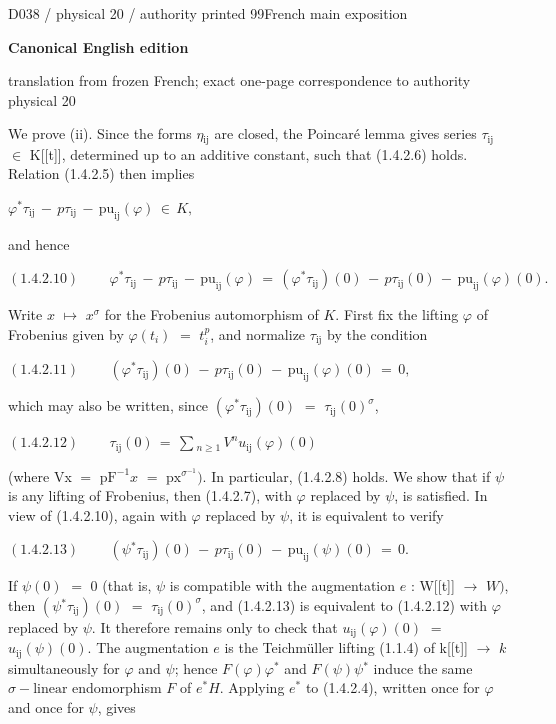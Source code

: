 \documentclass[9pt]{article}
\newcommand{\CanonText}[1]{\par{\fontsize{8.0}{9.35}\selectfont\RaggedRight #1\par}\vspace{2.2pt}}
\newcommand{\CanonDisplay}[1]{\par\vspace{1.2pt}\begin{center}{\fontsize{7.2}{8.4}\selectfont\(\displaystyle #1\)}\end{center}\vspace{1.2pt}}
\newcommand{\LayerTitle}{Canonical English edition}
\begin{document}
\noindent\begin{minipage}[t][\dimexpr\textheight-5pt\relax][t]{\textwidth}
{\sffamily\fontsize{7.3}{8.2}\selectfont\color{Quiet} D038 / physical 20 / authority printed 99\hfill French main exposition}
\par{}\vspace{4.5pt}
{\sffamily\fontsize{10.4}{11.6}\selectfont\bfseries\color{Accent} \LayerTitle}
\par{\sffamily\fontsize{6.7}{7.7}\selectfont\color{Quiet} translation from frozen French; exact one-page correspondence to authority physical 20}
\vspace{5pt}
\CanonText{We prove (ii). Since the forms \(\eta{}_{\mathrm{ij}}\) are closed, the Poincaré lemma gives series \(\tau{}_{\mathrm{ij}}\) \(\in{}\) K[[t]], determined up to an additive constant, such that (1.4.2.6) holds. Relation (1.4.2.5) then implies}
\CanonDisplay{\varphi{}^{*}\tau{}_{\mathrm{ij}}\,-\,p\tau{}_{\mathrm{ij}}\,-\,\text{pu}_{\mathrm{ij}}(\varphi{})\,\in{}\,K,}
\CanonText{and hence}
\CanonDisplay{(1.4.2.10)\qquad\,\varphi{}^{*}\tau{}_{\mathrm{ij}}\,-\,p\tau{}_{\mathrm{ij}}\,-\,\text{pu}_{\mathrm{ij}}(\varphi{})\,=\,(\varphi{}^{*}\tau{}_{\mathrm{ij}})(0)\,-\,p\tau{}_{\mathrm{ij}}(0)\,-\,\text{pu}_{\mathrm{ij}}(\varphi{})(0).}
\CanonText{Write \(x\) \(\mapsto{}\) \(x^\sigma{}\) for the Frobenius automorphism of \(K\). First fix the lifting \(\varphi{}\) of Frobenius given by \(\varphi{}(t_{i})\) \(=\) \(t_{i}^{p}\), and normalize \(\tau{}_{\mathrm{ij}}\) by the condition}
\CanonDisplay{(1.4.2.11)\qquad\,(\varphi{}^{*}\tau{}_{\mathrm{ij}})(0)\,-\,p\tau{}_{\mathrm{ij}}(0)\,-\,\text{pu}_{\mathrm{ij}}(\varphi{})(0)\,=\,0,}
\CanonText{which may also be written, since \((\varphi{}^{*}\tau{}_{\mathrm{ij}})(0)\) \(=\) \(\tau{}_{\mathrm{ij}}(0)^\sigma{}\),}
\CanonDisplay{(1.4.2.12)\qquad\,\tau{}_{\mathrm{ij}}(0)\,=\,\sum{}_{n\geq{}1}\,V^{n}u_{\mathrm{ij}}(\varphi{})(0)}
\CanonText{(where Vx \(=\) \(\text{pF}^{-1}x\) \(=\) \(\text{px}^{\sigma{}^{-1}})\). In particular, (1.4.2.8) holds. We show that if \(\psi{}\) is any lifting of Frobenius, then (1.4.2.7), with \(\varphi{}\) replaced by \(\psi{}\), is satisfied. In view of (1.4.2.10), again with \(\varphi{}\) replaced by \(\psi{}\), it is equivalent to verify}
\CanonDisplay{(1.4.2.13)\qquad\,(\psi{}^{*}\tau{}_{\mathrm{ij}})(0)\,-\,p\tau{}_{\mathrm{ij}}(0)\,-\,\text{pu}_{\mathrm{ij}}(\psi{})(0)\,=\,0.}
\CanonText{If \(\psi{}(0)\) \(=\) 0 (that is, \(\psi{}\) is compatible with the augmentation \(e\) : W[[t]] \(\to{}\) \(W)\), then \((\psi{}^{*}\tau{}_{\mathrm{ij}})(0)\) \(=\) \(\tau{}_{\mathrm{ij}}(0)^\sigma{}\), and (1.4.2.13) is equivalent to (1.4.2.12) with \(\varphi{}\) replaced by \(\psi{}\). It therefore remains only to check that \(u_{\mathrm{ij}}(\varphi{})(0)\) \(=\) \(u_{\mathrm{ij}}(\psi{})(0)\). The augmentation \(e\) is the Teichmüller lifting (1.1.4) of k[[t]] \(\to{}\) \(k\) simultaneously for \(\varphi{}\) and \(\psi{}\); hence \(F(\varphi{})\varphi{}^{*}\) and \(F(\psi{})\psi{}^{*}\) induce the same \(\sigma{}-\text{linear}\) endomorphism \(F\) of \(e^{*}H\). Applying \(e^{*}\) to (1.4.2.4), written once for \(\varphi{}\) and once for \(\psi{}\), gives}

\end{minipage}
\end{document}
